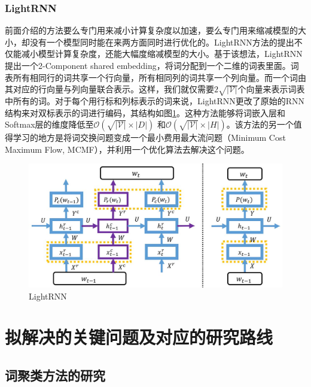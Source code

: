 \documentclass[12pt,a4paper]{article}
\begin{document}
\subsubsection{LightRNN}

前面介绍的方法要么专门用来减小计算复杂度以加速，要么专门用来缩减模型的大小，却没有一个模型同时能在来两方面同时进行优化的。LightRNN方法的提出不仅能减小模型计算复杂度，还能大幅度缩减模型的大小\cite{DBLP:conf/nips/LiQYHL16}。基于该想法，LightRNN提出一个2-Component shared embedding，将词分配到一个二维的词表里面。词表所有相同行的词共享一个行向量，所有相同列的词共享一个列向量。而一个词由其对应的行向量与列向量联合表示。这样，我们就仅需要${2\sqrt{|\mathcal{V}|}}$个向量来表示词表中所有的词。对于每个用行标和列标表示的词来说，LightRNN更改了原始的RNN 结构来对双标表示的词进行编码，其结构如图\ref{fig:lightrnn}。这种方法能够将词嵌入层和Softmax层的维度降低至${\mathcal{O}(\sqrt{|\mathcal{V}|} \times |D|)}$ 和${\mathcal{O}(\sqrt{|\mathcal{V}|} \times |H|)}$。该方法的另一个值得学习的地方是将词交换问题变成一个最小费用最大流问题（Minimum Cost Maximum Flow, MCMF），并利用一个优化算法\cite{Preis1999}去解决这个问题。
\begin{figure}[!h]
  \centering
  \includegraphics[width=0.65\columnwidth]{./figures/lightrnn.jpg}
  \caption{LightRNN}
  \label{fig:lightrnn}
\end{figure}

\section{拟解决的关键问题及对应的研究路线}
\subsection{词聚类方法的研究}
\end{document}
